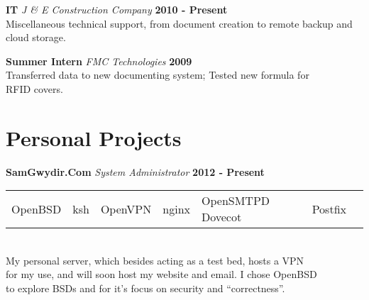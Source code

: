 \documentclass[margin,line]{res}
\begin{document}
{\begin{resume}
{\bf IT} {\em J \& E Construction Company} \hfill {\bf 2010 - Present}
\\
Miscellaneous technical support, from document creation to remote
backup and \\ cloud storage.
\vspace{-.13in}


{\bf Summer Intern} {\em FMC Technologies} \hfill {\bf 2009} \
\\
Transferred data to new documenting system; Tested new formula for \\ RFID covers.

\vspace*{.15in}
{\color{WildStrawberry}
  \vspace{-.13in}
  \section{\sc Personal Projects}}
\color{black}
{\bf SamGwydir.Com} {\em System Administrator} \hfill {\bf 2012 - Present} \
\\
\begin{tabular}{l l l l l l l}
   OpenBSD &  ksh &  OpenVPN &  nginx & OpenSMTPD
   Dovecot &  Postfix
\end{tabular}
\\
My personal server, which besides acting as a test bed, hosts a VPN \\
for my use, and will soon host my website and email. I chose OpenBSD \\
to explore BSDs and for it's focus on security and ``correctness''.
\vspace{-.13in}


\end{resume}}
\end{document}

